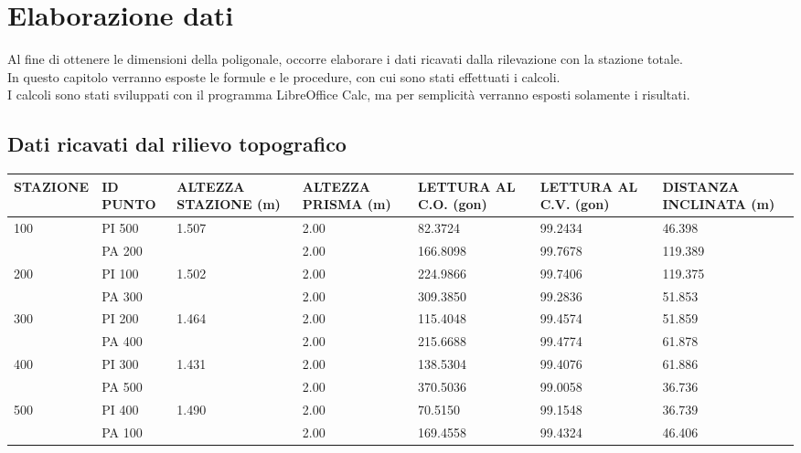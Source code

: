 \section{Elaborazione dati}
Al fine di ottenere le dimensioni della poligonale, occorre elaborare i dati ricavati dalla rilevazione con la stazione totale.\\
In questo capitolo verranno esposte le formule e le procedure, con cui sono stati effettuati i calcoli.\\
I calcoli sono stati sviluppati con il programma LibreOffice Calc, ma per semplicità verranno esposti solamente i risultati.
\subsection{Dati ricavati dal rilievo topografico}
\begin{tabular}{ p{2cm}|p{2cm}|p{2cm}|p{2cm}|p{2cm}|p{2cm}|p{2cm} }
\toprule
STAZIONE & ID PUNTO & ALTEZZA STAZIONE (m)   & ALTEZZA PRISMA (m) & LETTURA AL C.O. (gon) & LETTURA AL C.V. (gon) & DISTANZA INCLINATA (m) \\
\midrule
\multirow{2}{*}{100} & PI 500   & \multirow{2}{*}{1.507} & 2.00               & 82.3724               & 99.2434               & 46.398                 \\
                     & PA 200   &                        & 2.00               & 166.8098              & 99.7678               & 119.389                \\
\midrule
\multirow{2}{*}{200} & PI 100   & \multirow{2}{*}{1.502} & 2.00               & 224.9866              & 99.7406               & 119.375                \\
                     & PA 300   &                        & 2.00               & 309.3850              & 99.2836               & 51.853                 \\
\midrule
\multirow{2}{*}{300} & PI 200   & \multirow{2}{*}{1.464} & 2.00               & 115.4048              & 99.4574               & 51.859                 \\
                     & PA 400   &                        & 2.00               & 215.6688              & 99.4774               & 61.878                 \\
\midrule
\multirow{2}{*}{400} & PI 300   & \multirow{2}{*}{1.431} & 2.00               & 138.5304              & 99.4076               & 61.886                 \\
                     & PA 500   &                        & 2.00               & 370.5036              & 99.0058               & 36.736                 \\
\midrule
\multirow{2}{*}{500} & PI 400   & \multirow{2}{*}{1.490} & 2.00               & 70.5150               & 99.1548               & 36.739                 \\
                     & PA 100   &                        & 2.00               & 169.4558              & 99.4324               & 46.406     \\           
\bottomrule
\end{tabular}
